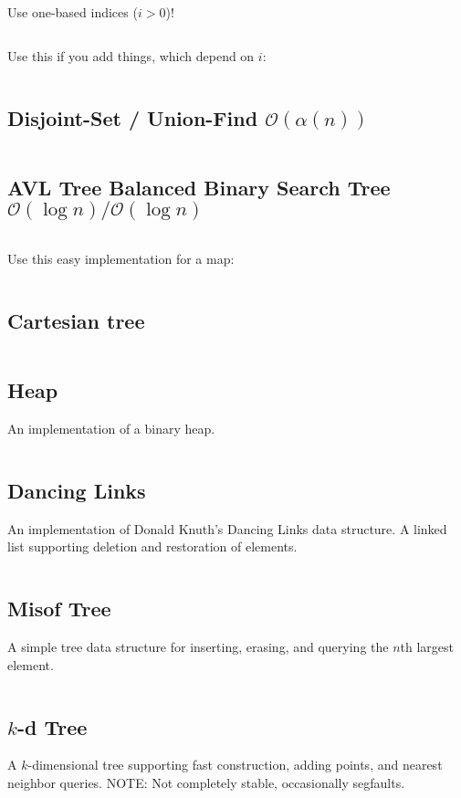 \documentclass[8pt,a4paper,landscape,oneside]{amsart}
\newcommand{\mintedstyle}[2]{\inputminted[fontsize=\normalsize,baselinestretch=.9,breaklines,tabsize=2]{#1}{code/#2}}
\newcommand{\code}[1]{\mintedstyle{cpp}{#1}}
\begin{document}
\begin{multicols*}{3}
Use one-based indices ($i > 0$)!
\code{datastructures/bit.cpp}

Use this if you add things, which depend on $i$:
\code{datastructures/fenwick_tree.cpp}

\subsection{Disjoint-Set / Union-Find $\mathcal{O}(\alpha (n))$}
\code{datastructures/dsu.cpp}

\subsection{AVL Tree Balanced Binary Search Tree $\mathcal{O}(\log n) / \mathcal{O}(\log n)$}
\code{datastructures/avl_tree.cpp}

Use this easy implementation for a map:
\code{datastructures/avl_tree_map.cpp}

\subsection{Cartesian tree}
\code{datastructures/cartesian_tree.cpp}

\subsection{Heap}
An implementation of a binary heap.
\code{datastructures/heap.cpp}

\subsection{Dancing Links}
An implementation of Donald Knuth's Dancing Links data structure. A
linked list supporting deletion and restoration of elements.
\code{datastructures/dancing_links.cpp}

\subsection{Misof Tree}
A simple tree data structure for inserting, erasing, and querying the
$n$th largest element.
\code{datastructures/misof_tree.cpp}

\subsection{$k$-d Tree}
A $k$-dimensional tree supporting fast construction, adding points, and
nearest neighbor queries.
NOTE: Not completely stable, occasionally segfaults.
\code{datastructures/kd_tree.cpp}


\end{multicols*}
\end{document}
